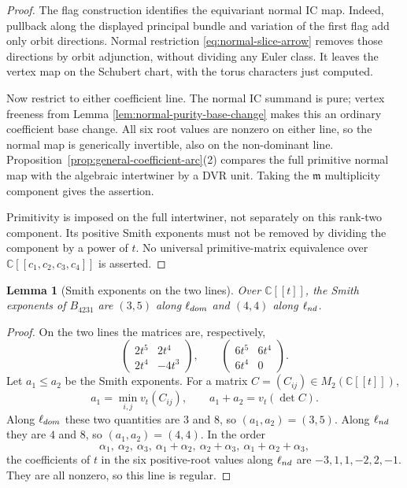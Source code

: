 \documentclass[10pt,a4paper]{amsart}
\newtheorem{lemma}[theorem]{Lemma}
\newcommand{\C}{\mathbb C}
\begin{document}
\begin{proof}
The flag construction identifies the equivariant normal IC map.
Indeed, pullback along the displayed principal bundle and variation
of the first flag add only orbit directions.  Normal restriction
\eqref{eq:normal-slice-arrow} removes those directions by orbit
adjunction, without dividing any Euler class.  It leaves the vertex
map on the Schubert chart, with the torus characters just computed.

Now restrict to either coefficient line.  The normal IC summand is
pure; vertex freeness from Lemma
\ref{lem:normal-purity-base-change} makes this an ordinary coefficient
base change.  All six root values are nonzero on either line, so the
normal map is generically invertible, also on the non-dominant line.
Proposition~\ref{prop:general-coefficient-arc}(2) compares the full
primitive normal map with the algebraic intertwiner by a DVR unit.
Taking the $\mathfrak m$ multiplicity component gives the assertion.

Primitivity is imposed on the full intertwiner, not separately on
this rank-two component.  Its positive Smith exponents must not be
removed by dividing the component by a power of $t$.  No universal
primitive-matrix equivalence over
$\mathbb C[[c_1,c_2,c_3,c_4]]$ is asserted.
\end{proof}

\begin{lemma}[Smith exponents on the two lines]\label{lem:appendix-smith}
Over $\C[[t]]$, the Smith exponents of
$B_{4231}$ are $(3,5)$ along $\ell_{\rm dom}$ and $(4,4)$ along
$\ell_{\rm nd}$.
\end{lemma}

\begin{proof}
On the two lines the matrices are, respectively,
\[
 \begin{pmatrix}2t^5&2t^4\\2t^4&-4t^3\end{pmatrix},
 \qquad
 \begin{pmatrix}6t^5&6t^4\\6t^4&0\end{pmatrix}.
\]
Let $a_1\leq a_2$ be the Smith exponents.  For a matrix
$C=(C_{ij})\in M_2(\mathbb C[[t]])$,
\[
 a_1=\min_{i,j}v_t(C_{ij}),\qquad
 a_1+a_2=v_t(\det C).
\]
Along $\ell_{\rm dom}$ these two quantities are $3$ and $8$, so
$(a_1,a_2)=(3,5)$.  Along $\ell_{\rm nd}$ they are $4$ and $8$, so
$(a_1,a_2)=(4,4)$.  In the order
\[
 \alpha_1,\ \alpha_2,\ \alpha_3,\ \alpha_1+\alpha_2,\
 \alpha_2+\alpha_3,\ \alpha_1+\alpha_2+\alpha_3,
\]
the coefficients of $t$ in the six positive-root values along
$\ell_{\rm nd}$ are $-3,1,1,-2,2,-1$.  They are all nonzero, so this line is
regular.
\end{proof}
\end{document}
